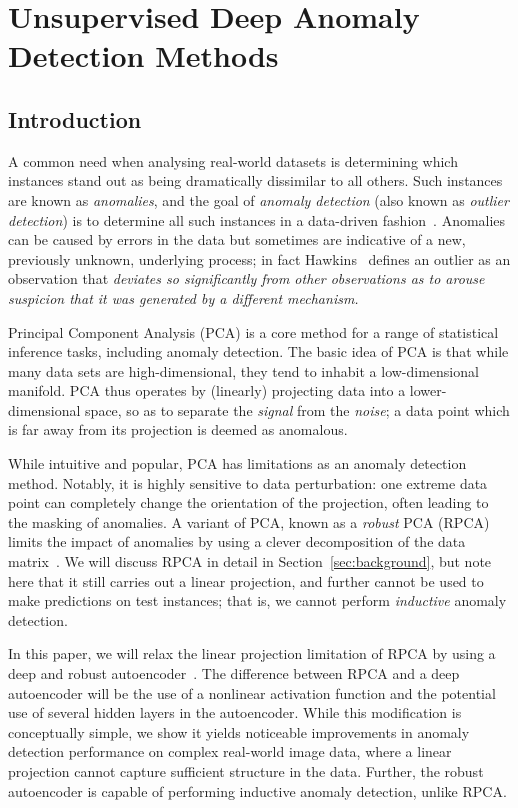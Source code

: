 \chapter{Unsupervised Deep Anomaly Detection Methods}
\label{chpt:unsupervisedDAD}
\section{Introduction}

A common need when analysing real-world datasets is determining which instances stand out as being dramatically dissimilar to all others.
Such instances are known as \emph{anomalies}, and the goal of \emph{anomaly detection} (also known as \emph{outlier detection}) is to determine all such instances in a data-driven fashion~\cite{chandola2007outlier}.
Anomalies can be caused by errors in the data but sometimes are indicative of a new, previously unknown, underlying process;
in fact Hawkins~\cite{hawkins} defines an outlier as an observation that {\it deviates so significantly from other observations as to arouse suspicion that it was generated by a different mechanism.}

Principal Component Analysis (PCA) \cite{Hotelling:1933} is a core method for a range of statistical inference tasks, including anomaly detection.
The basic idea of PCA is that while many data sets are high-dimensional, they tend to inhabit a {low-dimensional manifold}.
PCA thus operates by (linearly) projecting data into a lower-dimensional space, so as to separate the {\em signal} from the {\em noise};
a data point which is far away from its projection is deemed as anomalous.

While intuitive and popular, PCA has limitations as an anomaly detection method.
Notably, it is highly sensitive to data perturbation: one extreme data point can completely change the orientation of the projection, often leading to the masking of anomalies.
A variant of PCA, known as a \emph{robust} PCA (RPCA) limits the impact of anomalies by using a clever decomposition of the data matrix~\cite{candes2010robust}.
We will discuss RPCA in detail in Section~\ref{sec:background},
but note here that it still carries out a linear projection,
and further cannot be used to make predictions on test instances;
that is, we cannot perform \emph{inductive} anomaly detection.

In this paper, we will relax the linear projection limitation of RPCA by using a deep and robust autoencoder~\cite{vincent2010stacked,Goodfellow-et-al-2016}.
The difference between RPCA and a deep autoencoder will be the use of a nonlinear activation function and the potential use of several hidden layers in the autoencoder.
While this modification is conceptually simple, we show it yields noticeable improvements in anomaly detection performance on complex real-world image data, where a linear projection cannot capture sufficient structure in the data.
Further, the robust autoencoder is capable of performing inductive anomaly detection, unlike RPCA.

